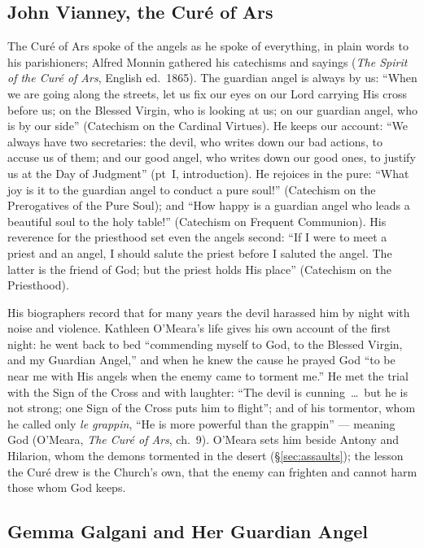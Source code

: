 \sectionguard\subsection{John Vianney, the Curé of Ars}\label{sec:sa-vianney}

The Curé of Ars spoke of the angels as he spoke of everything, in plain
words to his parishioners; Alfred Monnin gathered his catechisms and sayings
(\emph{The Spirit of the Curé of Ars}, English ed.\ 1865). The guardian
angel is always by us: ``When we are going along the streets, let us fix our eyes on our Lord carrying His cross before us; on
the Blessed Virgin, who is looking at us; on our guardian angel, who is by
our side'' (Catechism on the Cardinal Virtues). He keeps our account: ``We
always have two secretaries: the devil, who writes down our bad actions, to
accuse us of them; and our good angel, who writes down our good ones, to
justify us at the Day of Judgment'' (pt~I, introduction). He rejoices in
the pure: ``What joy is it to the guardian angel to conduct a pure soul!'' (Catechism
on the Prerogatives of the Pure Soul); and ``How happy is a guardian angel
who leads a beautiful soul to the holy table!'' (Catechism on Frequent Communion). His reverence
for the priesthood set even the angels second: ``If I were to meet a priest
and an angel, I should salute the priest before I saluted the angel. The
latter is the friend of God; but the priest holds His place'' (Catechism on
the Priesthood).

His biographers record that for many years the devil harassed him by night
with noise and violence. Kathleen O'Meara's life gives his own account of
the first night: he went back to bed ``commending myself to God, to the
Blessed Virgin, and my Guardian Angel,'' and when he knew the cause he
prayed God ``to be near me with His angels when the enemy came to torment
me.'' He met the trial with the Sign of the Cross and with laughter: ``The
devil is cunning~\dots\ but he is not strong; one Sign of the Cross puts him
to flight''; and of his tormentor, whom he called only \emph{le grappin},
``He is more powerful than the grappin'' --- meaning God (O'Meara, \emph{The
Curé of Ars}, ch.~9). O'Meara sets him beside Antony and Hilarion, whom
the demons tormented in the desert (\S\ref{sec:assaults}); the lesson the
Curé drew is the Church's own, that the enemy can frighten and cannot harm
those whom God keeps.

\sectionguard\subsection{Gemma Galgani and Her Guardian Angel}\label{sec:sa-gemma}

